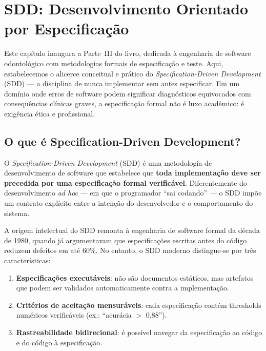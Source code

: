 \chapter{SDD: Desenvolvimento Orientado por Especificação}
\label{cap:sdd-metodologia}
\niveltres

Este capítulo inaugura a Parte~III do livro, dedicada à engenharia de
software odontológico com metodologias formais de especificação e teste.
Aqui, estabelecemos o alicerce conceitual e prático do
\textit{Specification-Driven Development} (SDD) — a disciplina de nunca
implementar sem antes especificar. Em um domínio onde erros de software
podem significar diagnósticos equivocados com consequências clínicas
graves, a especificação formal não é luxo acadêmico: é exigência
ética e profissional.

\section{O que é Specification-Driven Development?}

O \textit{Specification-Driven Development} (SDD) é uma metodologia de
desenvolvimento de software que estabelece que \textbf{toda implementação
deve ser precedida por uma especificação formal verificável}. Diferentemente
do desenvolvimento \textit{ad hoc} — em que o programador ``sai codando''
— o SDD impõe um contrato explícito entre a intenção do desenvolvedor e
o comportamento do sistema.


A origem intelectual do SDD remonta à engenharia de software formal da
década de 1980, quando  já argumentavam que
especificações escritas antes do código reduzem defeitos em até 60\%.
No entanto, o SDD moderno distingue-se por três características:

\begin{enumerate}
  \item \textbf{Especificações executáveis}: não são documentos estáticos,
    mas artefatos que podem ser validados automaticamente contra a
    implementação.
  \item \textbf{Critérios de aceitação mensuráveis}: cada especificação
    contém thresholds numéricos verificáveis (ex.: ``acurácia $>$ 0,88'').
  \item \textbf{Rastreabilidade bidirecional}: é possível navegar da
    especificação ao código e do código à especificação.
\end{enumerate}

